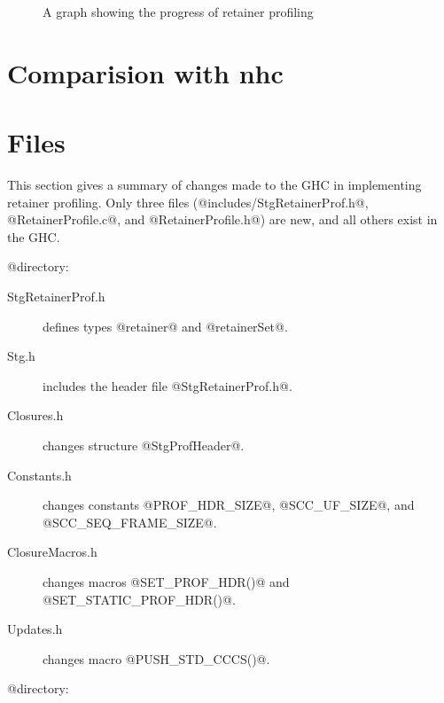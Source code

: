 \documentclass{article}
\begin{document}
\begin{figure}[ht]
\centering
{}
\caption{A graph showing the progress of retainer profiling}
\label{fig-cacheprof}
\end{figure}

\section{Comparision with nhc}

\section{Files}

This section gives a summary of changes made to the GHC in 
implementing retainer profiling.
Only three files (@includes/StgRetainerProf.h@, @RetainerProfile.c@, and 
@RetainerProfile.h@) are new, and all others exist in the GHC.

@ directory:

\begin{description}
\item[StgRetainerProf.h] defines types @retainer@ and @retainerSet@.
\item[Stg.h] includes the header file @StgRetainerProf.h@.
\item[Closures.h] changes structure @StgProfHeader@.
\item[Constants.h] changes constants @PROF_HDR_SIZE@, @SCC_UF_SIZE@, and
  @SCC_SEQ_FRAME_SIZE@.
\item[ClosureMacros.h] changes macros @SET_PROF_HDR()@ and 
  @SET_STATIC_PROF_HDR()@.
\item[Updates.h] changes macro @PUSH_STD_CCCS()@.
\end{description}

@\rts@ directory:
\end{document}
